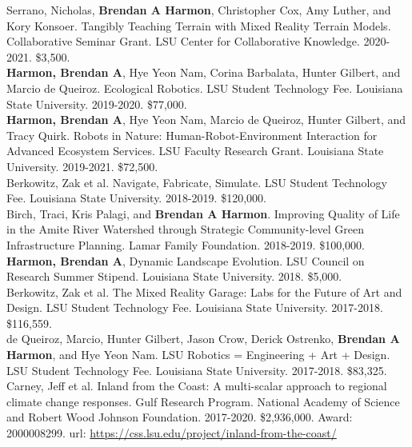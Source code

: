 \documentclass[10pt]{developercv} %
\begin{document}
Serrano, Nicholas, \textbf{Brendan A Harmon}, Christopher Cox, Amy Luther, and Kory Konsoer.
Tangibly Teaching Terrain with Mixed Reality Terrain Models.
Collaborative Seminar Grant. LSU Center for Collaborative Knowledge.
2020-2021. \$3,500.\\

\textbf{Harmon, Brendan A}, Hye Yeon Nam, Corina Barbalata, Hunter Gilbert, and Marcio de Queiroz.
Ecological Robotics.
LSU Student Technology Fee. Louisiana State University. 
2019-2020.	\$77,000.\\

\textbf{Harmon, Brendan A}, Hye Yeon Nam, Marcio de Queiroz, Hunter Gilbert, and Tracy Quirk. 
Robots in Nature: Human-Robot-Environment Interaction for Advanced Ecosystem Services. 
LSU Faculty Research Grant. Louisiana State University. 
2019-2021. \$72,500.\\

Berkowitz, Zak et al. Navigate, Fabricate, Simulate. 
LSU Student Technology Fee. Louisiana State University. 
2018-2019.	\$120,000.\\

Birch, Traci, Kris Palagi, and \textbf{Brendan A Harmon}. 
Improving Quality of Life in the Amite River Watershed through Strategic Community-level Green Infrastructure Planning. 
Lamar Family Foundation. 
2018-2019. \$100,000.\\

\textbf{Harmon, Brendan A}, 
Dynamic Landscape Evolution. 
LSU Council on Research Summer Stipend. Louisiana State University. 
2018. \$5,000.\\

Berkowitz, Zak et al. 
The Mixed Reality Garage: Labs for the Future of Art and Design. 
LSU Student Technology Fee. Louisiana State University. 
2017-2018. \$116,559.\\

de Queiroz, Marcio, Hunter Gilbert, Jason Crow, Derick Ostrenko, \textbf{Brendan A Harmon}, and Hye Yeon Nam. 
LSU Robotics = Engineering + Art + Design. 
LSU Student Technology Fee. Louisiana State University. 
2017-2018. \$83,325.\\

Carney, Jeff et al. 
Inland from the Coast: A multi-scalar approach to regional climate change responses. 
Gulf Research Program. National Academy of Science and Robert Wood Johnson Foundation.
2017-2020. \$2,936,000. Award: 2000008299.
url: \url{https://css.lsu.edu/project/inland-from-the-coast/}\\
\end{document}
